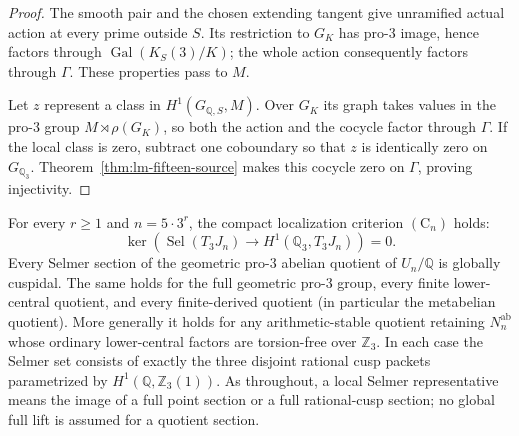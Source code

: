 \begin{proof}
The smooth pair and the chosen extending tangent give
unramified actual action at every prime outside $S$.
Its restriction to $G_K$ has pro-$3$ image, hence
factors through $\operatorname{Gal}(K_S(3)/K)$; the
whole action consequently factors through $\Gamma$.
These properties pass to $M$.

Let $z$ represent a class in $H^1(G_{\mathbb Q,S},M)$.
Over $G_K$ its graph takes values in the pro-$3$ group
$M\rtimes\rho(G_K)$, so both the action and the cocycle
factor through $\Gamma$.
If the local class is zero, subtract one coboundary
so that $z$ is identically zero on $G_{\mathbb Q_3}$.
Theorem~\ref{thm:lm-fifteen-source} makes this cocycle
zero on $\Gamma$, proving injectivity.
\end{proof}

\begin{theorem}
\label{thm:lm-five-power-selmer}
For every $r\ge1$ and $n=5\cdot3^r$, the compact
localization criterion $(\mathrm C_n)$ holds:
\[
 \ker\!\left(\operatorname{Sel}(T_3J_n)
       \longrightarrow H^1(\mathbb Q_3,T_3J_n)\right)=0.
\]
Every Selmer section of the geometric pro-$3$ abelian
quotient of $U_n/\mathbb Q$ is globally cuspidal.
The same holds for the full geometric pro-$3$ group,
every finite lower-central quotient, and every finite-derived
quotient (in particular the metabelian quotient).
More generally it holds for any arithmetic-stable quotient
retaining $N_n^{\mathrm{ab}}$ whose ordinary lower-central
factors are torsion-free over $\mathbb Z_3$.
In each case the Selmer set consists of exactly the
three disjoint rational cusp packets parametrized by
$H^1(\mathbb Q,\mathbb Z_3(1))$.
As throughout, a local Selmer representative means the
image of a full point section or a full rational-cusp section;
no global full lift is assumed for a quotient section.
\end{theorem}
